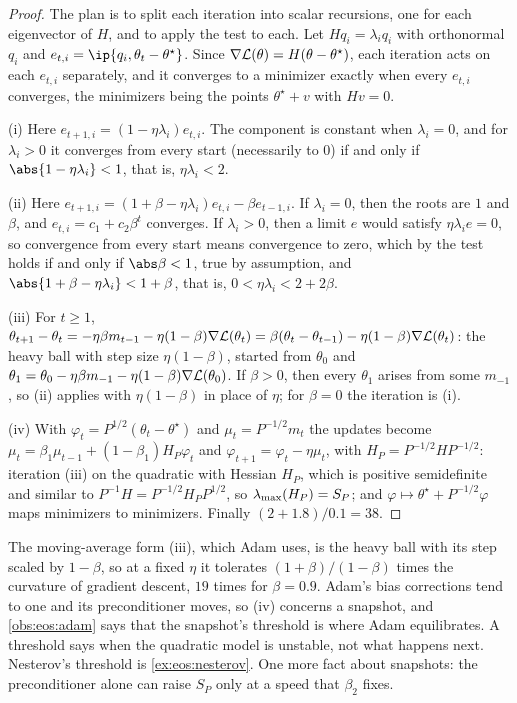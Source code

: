 \begin{refsection}
\begin{proof}
The plan is to split each iteration into scalar recursions, one for each eigenvector of $H$, and to apply the test to each. Let $Hq_i=\lambda_iq_i$ with orthonormal $q_i$ and $e_{t,i}=\ip{q_i,\theta_t-\theta^\star}$. Since $\nabla\mathcal{L}(\theta)=H(\theta-\theta^\star)$, each iteration acts on each $e_{t,i}$ separately, and it converges to a minimizer exactly when every $e_{t,i}$ converges, the minimizers being the points $\theta^\star+v$ with $Hv=0$.

(i) Here $e_{t+1,i}=(1-\eta\lambda_i)e_{t,i}$. The component is constant when $\lambda_i=0$, and for $\lambda_i>0$ it converges from every start (necessarily to $0$) if and only if $\abs{1-\eta\lambda_i}<1$, that is, $\eta\lambda_i<2$.

(ii) Here $e_{t+1,i}=(1+\beta-\eta\lambda_i)e_{t,i}-\beta e_{t-1,i}$. If $\lambda_i=0$, then the roots are $1$ and $\beta$, and $e_{t,i}=c_1+c_2\beta^t$ converges. If $\lambda_i>0$, then a limit $e$ would satisfy $\eta\lambda_ie=0$, so convergence from every start means convergence to zero, which by the test holds if and only if $\abs\beta<1$, true by assumption, and $\abs{1+\beta-\eta\lambda_i}<1+\beta$, that is, $0<\eta\lambda_i<2+2\beta$.

(iii) For $t\ge1$, $\theta_{t+1}-\theta_t=-\eta\beta m_{t-1}-\eta(1-\beta)\nabla\mathcal{L}(\theta_t)=\beta(\theta_t-\theta_{t-1})-\eta(1-\beta)\nabla\mathcal{L}(\theta_t)$: the heavy ball with step size $\eta(1-\beta)$, started from $\theta_0$ and $\theta_1=\theta_0-\eta\beta m_{-1}-\eta(1-\beta)\nabla\mathcal{L}(\theta_0)$. If $\beta>0$, then every $\theta_1$ arises from some $m_{-1}$, so (ii) applies with $\eta(1-\beta)$ in place of $\eta$; for $\beta=0$ the iteration is (i).

(iv) With $\varphi_t=P^{1/2}(\theta_t-\theta^\star)$ and $\mu_t=P^{-1/2}m_t$ the updates become $\mu_t=\beta_1\mu_{t-1}+(1-\beta_1)H_P\varphi_t$ and $\varphi_{t+1}=\varphi_t-\eta\mu_t$, with $H_P=P^{-1/2}HP^{-1/2}$: iteration (iii) on the quadratic with Hessian $H_P$, which is positive semidefinite and similar to $P^{-1}H=P^{-1/2}H_PP^{1/2}$, so $\lambda_{\max}(H_P)=S_P$; and $\varphi\mapsto\theta^\star+P^{-1/2}\varphi$ maps minimizers to minimizers. Finally $(2+1.8)/0.1=38$.
\end{proof}

The moving-average form (iii), which Adam uses, is the heavy ball with its step scaled by $1-\beta$, so at a fixed $\eta$ it tolerates $(1+\beta)/(1-\beta)$ times the curvature of gradient descent, $19$ times for $\beta=0.9$. Adam's bias corrections tend to one and its preconditioner moves, so (iv) concerns a snapshot, and \cref{obs:eos:adam} says that the snapshot's threshold is where Adam equilibrates. A threshold says when the quadratic model is unstable, not what happens next. Nesterov's threshold is \cref{ex:eos:nesterov}. One more fact about snapshots: the preconditioner alone can raise $S_P$ only at a speed that $\beta_2$ fixes.


\end{refsection}
